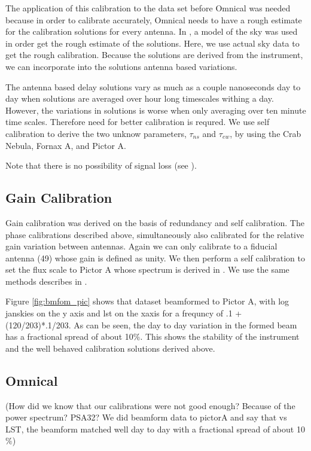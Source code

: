 \documentclass[twocolumn,numberedappendix]{emulateapj}
\begin{document}
The application of this calibration to the data set before Omnical was needed
because in order to calibrate accurately, Omnical needs to have a rough estimate
for the calibration solutions for every antenna. In \cite{zheng_et_al2014}, a
model of the sky was used in order get the rough estimate of the solutions.
Here, we use actual sky data to get the rough calibration. Because the solutions
are derived from the instrument, we can incorporate into the solutions antenna
based variations. 
 
The antenna based
delay solutions vary as much as a couple nanoseconds day to day when solutions
are averaged over hour long timescales withing a day. However, the variations in
solutions is worse when only averaging over ten minute time scales. Therefore
need for better calibration is requred.  We use self calibration to derive the
two unknow parameters, $\tau_{ns}$ and $\tau_{ew}$, by using the Crab Nebula,
Fornax A, and Pictor A.

Note that there is no possibility of signal loss (see \citep{parsons_et_al2014a}).

\subsection{Gain Calibration}
Gain calibration was derived on the basis of redundancy and self calibration.
The phase calibrations described above, simultaneously also calibrated for the
relative gain variation between antennas. Again we can only calibrate to a fiducial
antenna (49) whose gain is defined as unity. We then perform a self calibration
to set the flux scale to Pictor A whose spectrum is derived in
\citep{jacobs_et_al2013}. We use the same methods describes in \citep{parsons_et_al2014a}.

Figure \ref{fig:bmfom_pic} shows that dataset beamformed to Pictor A, with log
janskies on the y axis and lst on the xaxis for a frequncy of .1 + (120/203)*.1/203. 
As can be seen, the day to day variation in the formed beam has a fractional
spread of about 10$\%$.  This shows the stability of the instrument and the well
behaved calibration solutions derived above. 

\subsection{Omnical}
(How did we know that our calibrations were not good enough? Because of the power
spectrum? PSA32? We did beamform data to pictorA and say that vs LST, the
beamform matched well day to day with a fractional spread of about 10$\%$) 
\end{document}
